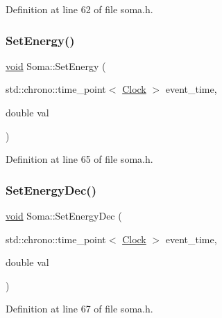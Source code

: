Definition at line 62 of file soma.\+h.

\mbox{\label{class_soma_a0d1c0271fc8eeacd6e8836f751dff331}} 
\subsubsection{\texorpdfstring{Set\+Energy()}{SetEnergy()}}
{\footnotesize\ttfamily \mbox{\hyperlink{glad_8h_a950fc91edb4504f62f1c577bf4727c29}{void}} Soma\+::\+Set\+Energy (\begin{DoxyParamCaption}\item[{std\+::chrono\+::time\+\_\+point$<$ \mbox{\hyperlink{universe_8h_a0ef8d951d1ca5ab3cfaf7ab4c7a6fd80}{Clock}} $>$}]{event\+\_\+time,  }\item[{double}]{val }\end{DoxyParamCaption})\hspace{0.3cm}{\ttfamily [inline]}}



Definition at line 65 of file soma.\+h.

\mbox{\label{class_soma_a37081f7a8fc7832f8e89629221ddb8a6}} 
\subsubsection{\texorpdfstring{Set\+Energy\+Dec()}{SetEnergyDec()}}
{\footnotesize\ttfamily \mbox{\hyperlink{glad_8h_a950fc91edb4504f62f1c577bf4727c29}{void}} Soma\+::\+Set\+Energy\+Dec (\begin{DoxyParamCaption}\item[{std\+::chrono\+::time\+\_\+point$<$ \mbox{\hyperlink{universe_8h_a0ef8d951d1ca5ab3cfaf7ab4c7a6fd80}{Clock}} $>$}]{event\+\_\+time,  }\item[{double}]{val }\end{DoxyParamCaption})\hspace{0.3cm}{\ttfamily [inline]}}



Definition at line 67 of file soma.\+h.

\mbox{\label{class_soma_a414afd7eb780e29a432603198a9838ed}} 

